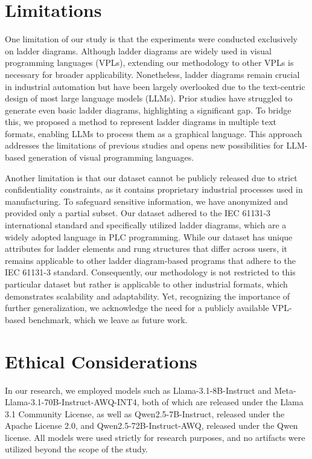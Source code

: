 \section*{Limitations}
One limitation of our study is that the experiments were conducted exclusively on ladder diagrams. Although ladder diagrams are widely used in visual programming languages (VPLs), extending our methodology to other VPLs is necessary for broader applicability. Nonetheless, ladder diagrams remain crucial in industrial automation but have been largely overlooked due to the text-centric design of most large language models (LLMs). Prior studies have struggled to generate even basic ladder diagrams, highlighting a significant gap. To bridge this, we proposed a method to represent ladder diagrams in multiple text formats, enabling LLMs to process them as a graphical language. This approach addresses the limitations of previous studies and opens new possibilities for LLM-based generation of visual programming languages.

Another limitation is that our dataset cannot be publicly released due to strict confidentiality constraints, as it contains proprietary industrial processes used in manufacturing. To safeguard sensitive information, we have anonymized and provided only a partial subset. Our dataset adhered to the IEC 61131-3 international standard and specifically utilized ladder diagrams, which are a widely adopted language in PLC programming. While our dataset has unique attributes for ladder elements and rung structures that differ across users, it remains applicable to other ladder diagram-based programs that adhere to the IEC 61131-3 standard. Consequently, our methodology is not restricted to this particular dataset but rather is applicable to other industrial formats, which demonstrates scalability and adaptability. Yet, recognizing the importance of further generalization, we acknowledge the need for a publicly available VPL-based benchmark, which we leave as future work.
\section*{Ethical Considerations}
In our research, we employed models such as Llama-3.1-8B-Instruct and Meta-Llama-3.1-70B-Instruct-AWQ-INT4, both of which are released under the Llama 3.1 Community License, as well as Qwen2.5-7B-Instruct, released under the Apache License 2.0, and Qwen2.5-72B-Instruct-AWQ, released under the Qwen license. All models were used strictly for research purposes, and no artifacts were utilized beyond the scope of the study.